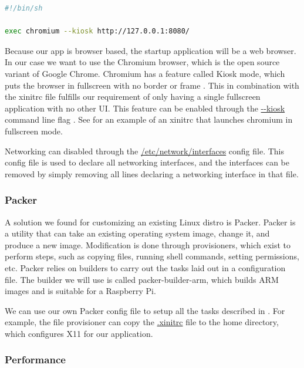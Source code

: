 \begin{lstlisting}[language=bash, label={lst:xinitrc}, caption=Example .xinitrc]
#!/bin/sh

exec chromium --kiosk http://127.0.0.1:8080/
\end{lstlisting}

Because our app is browser based, the startup application will be a web browser. In our
case we want to use the Chromium browser, which is the open source variant of Google
Chrome. Chromium has a feature called Kiosk mode, which puts the browser in fullscreen
with no border or frame \autocite{chromiumKioskMode}. This in combination with the xinitrc
file fulfills our requirement of only having a single fullscreen application with no other
UI. This feature can be enabled through the \url{--kiosk} command line flag
\autocite{chromiumKioskMode}. See  for an example of an xinitrc that
launches chromium in fullscreen mode.

Networking can disabled through the \url{/etc/network/interfaces} config file. This config
file is used to declare all networking interfaces, and the interfaces can be removed by
simply removing all lines declaring a networking interface in that file.

\subsubsection{Packer}
\label{sec:packer}

A solution we found for customizing an existing Linux distro is Packer. Packer is a
utility that can take an existing operating system image, change it, and produce a new
image. Modification is done through provisioners, which exist to perform steps, such as
copying files, running shell commands, setting permissions, etc. Packer relies on builders
to carry out the tasks laid out in a configuration file. The builder we will use is called
packer-builder-arm, which builds ARM images and is suitable for a Raspberry Pi.

We can use our own Packer config file to setup all the tasks described in
. For example, the file provisioner can copy the
\url{.xinitrc} file to the home directory, which configures X11 for our application.

\subsubsection{Performance}

